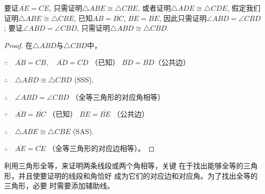 \begin{analyze}
    要证$\overline{AE}=\overline{CE}$, 只需证明$\triangle ABE\cong \triangle CBE$, 或者证明$\triangle ADE\cong \triangle CDE$, 假定我们证明$\triangle ABE\cong \triangle CBE$,
    已知$\overline{AB}=\overline{BC}$, $\overline{BE}=\overline{BE}$, 因此只需证明$\angle ABD=\angle CBD$;
    要证$\angle ABD=\angle CBD$, 只需证明$\triangle ABD\cong\triangle CBD$.
\end{analyze}

\begin{proof}
    在$\triangle ABD$与$\triangle CBD$中，

    $\because\quad \overline{AB}=\overline{CB},\quad \overline{AD}=\overline{CD}$ （已知）   $\overline{BD}=\overline{BD}$（公共边）

    $\therefore\quad \triangle ABD\cong \triangle CBD$ (SSS).

    $\therefore\quad \angle ABD=\angle CBD$ （全等三角形的对应角相等）

$\because\quad     \overline{AB}=\overline{BC}$ （已知） 
    $\overline{BE}=\overline{BE}$ （公共边）

$\therefore\quad \triangle ABE\cong \triangle CBE$ (SAS).

$\therefore\quad \overline{AE}=\overline{CE}$ （全等三角形的对应边相等）。
\end{proof}

    利用三角形全等，来证明两条线段或两个角相等，关键
    在于找出能够全等的三角形，并且使要证明的线段和角恰好
    成为它们的对应边和对应角。为了找出全等的三角形，必要
    时需要添加辅助线。  

